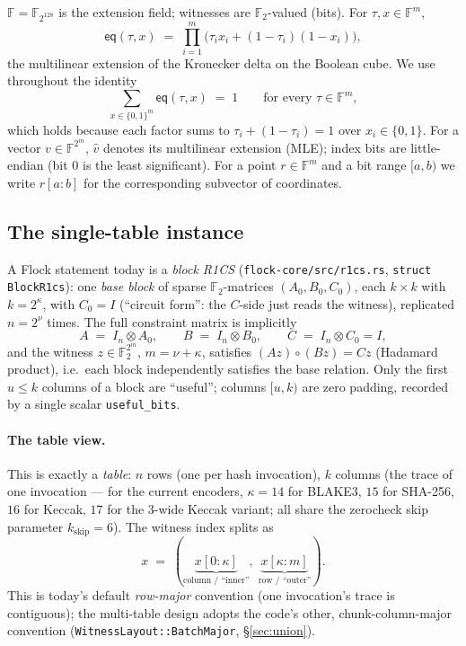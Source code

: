 \documentclass[11pt]{article}
\newcommand{\F}{\mathbb{F}}                       %
\newcommand{\Ftwo}{\F_2}
\newcommand{\eq}{\mathsf{eq}}
\newcommand{\code}[1]{\texttt{#1}}
\theoremstyle{definition}
\begin{document}
$\F = \F_{2^{128}}$ is the extension field; witnesses are $\Ftwo$-valued
(bits). For $\tau, x \in \F^m$,
\[
  \eq(\tau, x) \;=\; \prod_{i=1}^{m} \bigl(\tau_i x_i + (1-\tau_i)(1-x_i)\bigr),
\]
the multilinear extension of the Kronecker delta on the Boolean cube. We use
throughout the identity
\begin{equation}\label{eq:eqsum}
  \sum_{x \in \{0,1\}^m} \eq(\tau, x) \;=\; 1
  \qquad\text{for every } \tau \in \F^m,
\end{equation}
which holds because each factor sums to $\tau_i + (1-\tau_i) = 1$ over
$x_i \in \{0,1\}$. For a vector $v \in \F^{2^m}$, $\hat v$ denotes its
multilinear extension (MLE); index bits are little-endian (bit $0$ is the
least significant). For a point $r \in \F^m$ and a bit range $[a,b)$ we write
$r[a{:}b]$ for the corresponding subvector of coordinates.

\subsection{The single-table instance}\label{sec:single}

A Flock statement today is a \emph{block R1CS}
(\code{flock-core/src/r1cs.rs}, \code{struct BlockR1cs}): one \emph{base
block} of sparse $\Ftwo$-matrices $(A_0, B_0, C_0)$, each $k \times k$ with
$k = 2^{\kappa}$, with $C_0 = I$ (``circuit form'': the $C$-side just reads
the witness), replicated $n = 2^{\nu}$ times. The full constraint matrix is
implicitly
\[
  A \;=\; I_{n} \otimes A_0, \qquad B \;=\; I_{n} \otimes B_0,
  \qquad C \;=\; I_{n} \otimes C_0 = I,
\]
and the witness $z \in \Ftwo^{2^{m}}$, $m = \nu + \kappa$, satisfies
$(Az) \circ (Bz) = Cz$ (Hadamard product), i.e.\ each block independently
satisfies the base relation. Only the first $u \le k$ columns of a block are
``useful''; columns $[u, k)$ are zero padding, recorded by a single scalar
\code{useful\_bits}.

\paragraph{The table view.} This is exactly a \emph{table}: $n$ rows (one per
hash invocation), $k$ columns (the trace of one invocation --- for the current
encoders, $\kappa = 14$ for BLAKE3, $15$ for SHA-256, $16$ for Keccak, $17$
for the 3-wide Keccak variant; all share the zerocheck skip parameter
$k_{\mathrm{skip}} = 6$). The witness index splits as
\[
  x \;=\; (\underbrace{x[0{:}\kappa]}_{\text{column / ``inner''}},\;
           \underbrace{x[\kappa{:}m]}_{\text{row / ``outer''}}).
\]
This is today's default \emph{row-major} convention (one invocation's
trace is contiguous); the multi-table design adopts the code's other,
chunk-column-major convention (\code{WitnessLayout::BatchMajor},
\S\ref{sec:union}).
\end{document}

